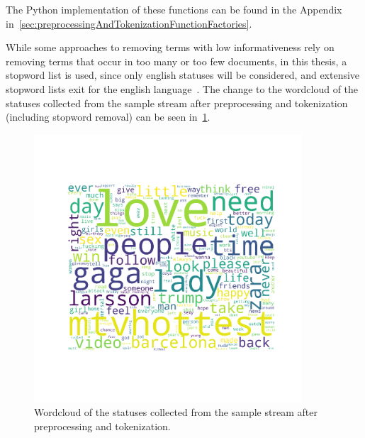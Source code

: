 The Python implementation of these functions can be found in the Appendix in~\ref{sec:preprocessingAndTokenizationFunctionFactories}.
\par
While some approaches to removing terms with low informativeness rely on removing terms that occur in too many or too few documents,
in this thesis, a stopword list is used,
since only english statuses will be considered, and extensive stopword lists exit for the english language~\cite{Porter2001}.
The change to the wordcloud of the statuses collected from the sample stream after preprocessing and tokenization (including stopword removal) can be seen in~\ref{fig:wordloud_post}.

\begin{figure}
    \centering
    \caption{Wordcloud of the statuses collected from the sample stream after preprocessing and tokenization.}
    \label{fig:wordloud_post}
    \includegraphics[width=10cm]{../images/wordcloud_post.png}
\end{figure}
